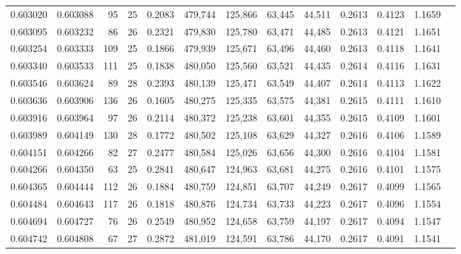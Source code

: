\begin{tabular}{rrrrrrrrrrrrr}
0.603020 & 0.603088 &     95 &    25 &                                     0.2083 & 479,744 & 125,866 &  63,445 &  44,511 & 0.2613 & 0.4123 & 1.1659 \\
0.603095 & 0.603232 &     86 &    26 &                                     0.2321 & 479,830 & 125,780 &  63,471 &  44,485 & 0.2613 & 0.4121 & 1.1651 \\
0.603254 & 0.603333 &    109 &    25 &                                     0.1866 & 479,939 & 125,671 &  63,496 &  44,460 & 0.2613 & 0.4118 & 1.1641 \\
0.603340 & 0.603533 &    111 &    25 &                                     0.1838 & 480,050 & 125,560 &  63,521 &  44,435 & 0.2614 & 0.4116 & 1.1631 \\
0.603546 & 0.603624 &     89 &    28 &                                     0.2393 & 480,139 & 125,471 &  63,549 &  44,407 & 0.2614 & 0.4113 & 1.1622 \\
0.603636 & 0.603906 &    136 &    26 &                                     0.1605 & 480,275 & 125,335 &  63,575 &  44,381 & 0.2615 & 0.4111 & 1.1610 \\
0.603916 & 0.603964 &     97 &    26 &                                     0.2114 & 480,372 & 125,238 &  63,601 &  44,355 & 0.2615 & 0.4109 & 1.1601 \\
0.603989 & 0.604149 &    130 &    28 &                                     0.1772 & 480,502 & 125,108 &  63,629 &  44,327 & 0.2616 & 0.4106 & 1.1589 \\
0.604151 & 0.604266 &     82 &    27 &                                     0.2477 & 480,584 & 125,026 &  63,656 &  44,300 & 0.2616 & 0.4104 & 1.1581 \\
0.604266 & 0.604350 &     63 &    25 &                                     0.2841 & 480,647 & 124,963 &  63,681 &  44,275 & 0.2616 & 0.4101 & 1.1575 \\
0.604365 & 0.604444 &    112 &    26 &                                     0.1884 & 480,759 & 124,851 &  63,707 &  44,249 & 0.2617 & 0.4099 & 1.1565 \\
0.604484 & 0.604643 &    117 &    26 &                                     0.1818 & 480,876 & 124,734 &  63,733 &  44,223 & 0.2617 & 0.4096 & 1.1554 \\
0.604694 & 0.604727 &     76 &    26 &                                     0.2549 & 480,952 & 124,658 &  63,759 &  44,197 & 0.2617 & 0.4094 & 1.1547 \\
0.604742 & 0.604808 &     67 &    27 &                                     0.2872 & 481,019 & 124,591 &  63,786 &  44,170 & 0.2617 & 0.4091 & 1.1541 \\

\end{tabular}
